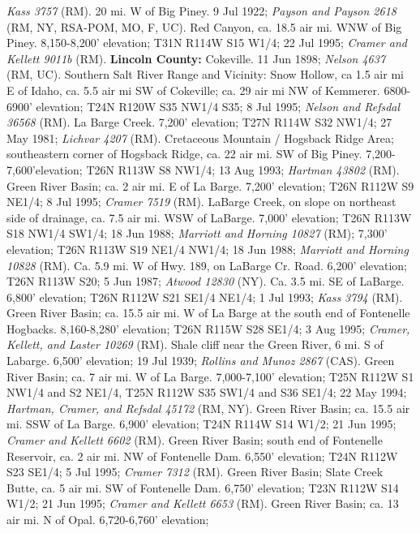 \textit{Kass 3757} (RM).
20 mi. W of Big Piney. 9 Jul 1922;
\textit{Payson and Payson 2618} (RM, NY, RSA-POM, MO, F, UC).
Red Canyon, ca. 18.5 air mi. WNW of Big Piney. 8,150-8,200’ elevation;
T31N R114W S15 W1/4; 22 Jul 1995; \textit{Cramer and Kellett 9011b} (RM).
  \textbf{Lincoln County:}
Cokeville. 11 Jun 1898; \textit{Nelson 4637} (RM, UC).
Southern Salt River Range and Vicinity: Snow Hollow, ca 1.5 air mi E of Idaho,
ca. 5.5 air mi SW of Cokeville; ca. 29 air mi NW of Kemmerer.
6800-6900' elevation; T24N R120W S35 NW1/4 S35; 8 Jul 1995;
\textit{Nelson and Refsdal 36568} (RM).
La Barge Creek. 7,200' elevation; T27N R114W S32	NW1/4; 27 May 1981;
\textit{Lichvar 4207} (RM).
Cretaceous Mountain / Hogsback Ridge Area; southeastern corner of Hogsback
Ridge, ca. 22 air mi. SW of Big Piney. 7,200-7,600'elevation; T26N R113W S8
NW1/4; 13 Aug 1993; \textit{Hartman 43802} (RM).
Green River Basin; ca. 2 air mi. E of La Barge. 7,200' elevation;
T26N R112W S9 NE1/4; 8 Jul 1995; \textit{Cramer 7519} (RM).
LaBarge Creek, on slope on northeast side of drainage, ca. 7.5 air mi.
WSW of LaBarge. 7,000’ elevation; T26N R113W S18 NW1/4 SW1/4; 18 Jun 1988;
\textit{Marriott and Horning 10827} (RM);
7,300’ elevation; T26N R113W S19 NE1/4 NW1/4; 18 Jun 1988;
\textit{Marriott and Horning 10828} (RM).
Ca. 5.9 mi. W of Hwy. 189, on LaBarge Cr. Road. 6,200' elevation;
T26N R113W S20; 5 Jun 1987; \textit{Atwood 12830} (NY).
Ca. 3.5 mi. SE of LaBarge. 6,800' elevation; T26N R112W S21 SE1/4 NE1/4;
1 Jul 1993; \textit{Kass 3794} (RM).
Green River Basin; ca. 15.5 air mi. W of La Barge at the south end of
Fontenelle Hogbacks. 8,160-8,280' elevation; T26N R115W S28	SE1/4; 3 Aug 1995;
\textit{Cramer, Kellett, and Laster 10269} (RM).
Shale cliff near the Green River, 6 mi. S of Labarge. 6,500' elevation;
19 Jul 1939; \textit{Rollins and Munoz 2867} (CAS).
Green River Basin; ca. 7 air mi. W of La Barge. 7,000-7,100' elevation;
T25N R112W S1 NW1/4 and S2 NE1/4, T25N R112W S35 SW1/4 and S36 SE1/4;
22 May 1994; \textit{Hartman, Cramer, and Refsdal 45172} (RM, NY).
Green River Basin; ca. 15.5 air mi. SSW of La Barge. 6,900' elevation;
T24N R114W S14 W1/2; 21 Jun 1995; \textit{Cramer and Kellett 6602} (RM).
Green River Basin; south end of Fontenelle Reservoir, ca. 2 air mi. NW of
Fontenelle Dam. 6,550' elevation; T24N R112W S23 SE1/4; 5 Jul 1995;
\textit{Cramer 7312} (RM).
Green River Basin; Slate Creek Butte, ca. 5 air mi. SW of Fontenelle Dam.
6,750' elevation; T23N R112W S14 W1/2; 21 Jun 1995;
\textit{Cramer and Kellett 6653} (RM).
Green River Basin; ca. 13 air mi. N of Opal. 6,720-6,760' elevation;
